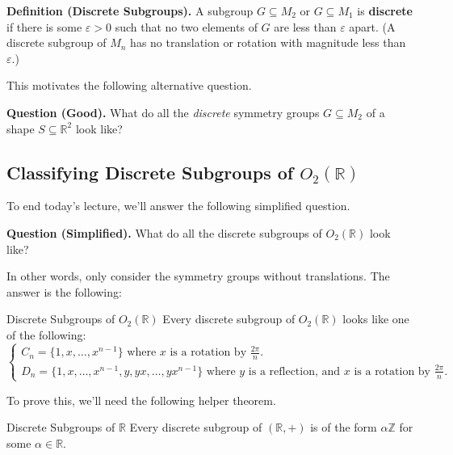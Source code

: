\textbf{Definition (Discrete Subgroups).} A subgroup $G \subseteq M_2$ or $G \subseteq M_1$ is \textbf{discrete} if there is some $\varepsilon > 0$ such that no two elements of $G$ are less than $\varepsilon$ apart.  (A discrete subgroup of $M_n$ has no translation or rotation with magnitude less than $\varepsilon$.)

This motivates the following alternative question.

\begin{boxed-text}[42em]
\textbf{Question (Good).} What do all the \emph{discrete} symmetry groups $G \subseteq M_2$ of a shape $S \subseteq \mathbb{R}^2$ look like?
\end{boxed-text}

\subsection{Classifying Discrete Subgroups of $O_2(\mathbb{R})$}

To end today's lecture, we'll answer the following simplified question.

\begin{boxed-text}[42em]
\textbf{Question (Simplified).} What do all the discrete subgroups of $O_2(\mathbb{R})$ look like?
\end{boxed-text}

In other words, only consider the symmetry groups without translations.  The answer is the following:

\begin{theorem}{Discrete Subgroups of $O_2(\mathbb{R})$}
    Every discrete subgroup of $O_2(\mathbb{R})$ looks like one of the following:
\[
    \begin{cases}
        C_n = \{1, x, \dots, x^{n - 1} \} \text{ where } x \text{ is a rotation by } \frac{2\pi}{n}. \\
        D_n = \{1, x, \dots, x^{n - 1}, y, yx, \dots, yx^{n - 1} \} \text{ where } y \text{ is a reflection, and } x \text{ is a rotation by } \frac{2\pi}{n}.
    \end{cases}
\] \vspace{-0.5cm}
\end{theorem}

To prove this, we'll need the following helper theorem.

\begin{theorem}{Discrete Subgroups of $\mathbb{R}$}
    Every discrete subgroup of $(\mathbb{R}, +)$ is of the form $\alpha \mathbb{Z}$ for some $\alpha \in \mathbb{R}$.
\end{theorem}


